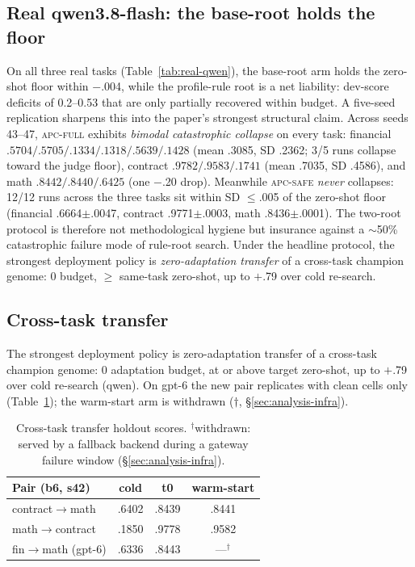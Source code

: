 \documentclass[11pt]{article}
\begin{document}
\subsection{Real qwen3.8-flash: the base-root holds the floor}
On all three real tasks (Table~\ref{tab:real-qwen}), the base-root arm holds the zero-shot floor within $-$.004, while the profile-rule root is a net liability: dev-score deficits of 0.2--0.53 that are only partially recovered within budget. A five-seed replication sharpens this into the paper's strongest structural claim. Across seeds 43--47, \textsc{apc-full} exhibits \emph{bimodal catastrophic collapse} on every task: financial $.5704/.5705/.1334/.1318/.5639/.1428$ (mean .3085, SD .2362; 3/5 runs collapse toward the judge floor), contract $.9782/.9583/.1741$ (mean .7035, SD .4586), and math $.8442/.8440/.6425$ (one $-$.20 drop). Meanwhile \textsc{apc-safe} \emph{never} collapses: 12/12 runs across the three tasks sit within SD $\leq$.005 of the zero-shot floor (financial .6664$\pm$.0047, contract .9771$\pm$.0003, math .8436$\pm$.0001). The two-root protocol is therefore not methodological hygiene but insurance against a $\sim$50\% catastrophic failure mode of rule-root search. Under the headline protocol, the strongest deployment policy is \emph{zero-adaptation transfer} of a cross-task champion genome: 0 budget, $\geq$ same-task zero-shot, up to $+$.79 over cold re-search.
\subsection{Cross-task transfer}
\label{sec:results-transfer}
The strongest deployment policy is zero-adaptation transfer of a cross-task champion
genome: 0 adaptation budget, at or above target zero-shot, up to $+$.79 over cold
re-search (qwen). On gpt-6 the new pair replicates with clean cells only
(Table~\ref{tab:transfer}); the warm-start arm is withdrawn ($\dagger$,
\S\ref{sec:analysis-infra}).
\begin{table}[t]
\centering\small
\begin{tabular}{lccc}
\toprule
Pair (b6, s42) & cold & t0 & warm-start \\
\midrule
contract$\to$math & .6402 & .8439 & .8441 \\
math$\to$contract & .1850 & .9778 & .9582 \\
fin$\to$math (gpt-6) & .6336 & .8443 & ---$^{\dagger}$ \\
\bottomrule
\end{tabular}
\caption{Cross-task transfer holdout scores. $^{\dagger}$withdrawn: served by a fallback backend during a gateway failure window (\S\ref{sec:analysis-infra}).}
\label{tab:transfer}
\end{table}
\end{document}
